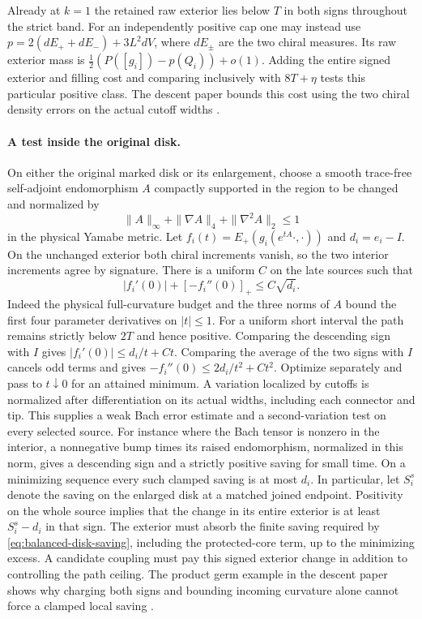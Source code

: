 Already at \(k=1\) the retained raw exterior lies below \(T\) in
both signs throughout the strict band. For an independently positive
cap one may instead use \(p=2(dE_++dE_-)+3L^2dV\), where \(dE_\pm\)
are the two chiral measures. Its raw exterior mass is
\(\tfrac12(P([g_i])-p(Q_i))+o(1)\).
Adding the entire signed exterior and filling cost and comparing
inclusively with \(8T+\eta\) tests this particular positive class.
The descent paper bounds this cost using the two chiral density
errors on the actual cutoff widths \cite{Baker2026FixedDescent}.

\paragraph{A test inside the original disk.}
On either the original marked disk or its enlargement, choose a
smooth trace-free self-adjoint endomorphism \(A\) compactly
supported in the region to be changed and normalized by
\[
 \|A\|_\infty+\|\nabla A\|_4+\|\nabla^2A\|_2\le1
\]
in the physical Yamabe metric. Let \(f_i(t)=E_+(g_i(e^{tA}\cdot,\cdot))\)
and \(d_i=e_i-I\). On the unchanged exterior both chiral increments
vanish, so the two interior increments agree by signature.
There is a uniform \(C\) on the late sources such that
\[
 |f_i'(0)|+[-f_i''(0)]_+\le C\sqrt{d_i}.
\]
Indeed the physical full-curvature budget and the three norms of
\(A\) bound the first four parameter derivatives on \(|t|\le1\).
For a uniform short interval the path remains strictly below \(2T\)
and hence positive. Comparing the descending sign with \(I\) gives
\(|f_i'(0)|\le d_i/t+Ct\). Comparing the average of the two signs
with \(I\) cancels odd terms and gives
\(-f_i''(0)\le2d_i/t^2+Ct^2\). Optimize separately and pass to
\(t\downarrow0\) for an attained minimum. A variation localized by
cutoffs is normalized after differentiation on its actual widths,
including each connector and tip. This supplies a weak Bach error
estimate and a second-variation test on every selected source.
For instance where the Bach tensor is nonzero in the interior,
a nonnegative bump times its raised endomorphism, normalized in
this norm, gives a descending sign and a strictly positive saving
for small time. On a minimizing sequence every such clamped saving
is at most \(d_i\). In particular, let \(S_i^s\) denote the saving
on the enlarged disk at a matched joined endpoint. Positivity on
the whole source implies that the change in its entire exterior is
at least \(S_i^s-d_i\) in that sign. The exterior must absorb the
finite saving required by \eqref{eq:balanced-disk-saving}, including
the protected-core term, up to the minimizing excess. A candidate
coupling must pay this signed exterior change in addition to controlling
the path ceiling.
The product germ example in the descent paper shows why charging both
signs and bounding incoming curvature alone cannot force a clamped
local saving \cite[section on variations on the charged interior]{Baker2026FixedDescent}.
